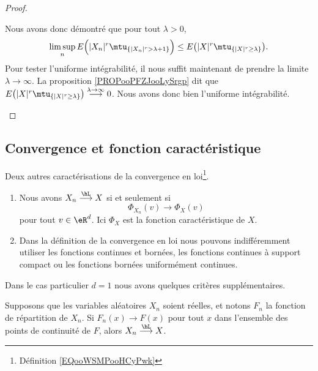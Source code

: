 \begin{proof}
\begin{subproof}
		Nous avons donc démontré que pour tout \( \lambda>0\),
		\begin{equation}
			\limsup_n E\Big( | X_n |^r\mtu_{\{ | X_n |^r>\lambda+1 \}} \Big) \leq E\big( | X |^r\mtu_{\{ | X |^r\geq \lambda \}} \big).
		\end{equation}
		Pour tester l'uniforme intégrabilité, il nous suffit maintenant de prendre la limite \( \lambda\to \infty\). La proposition \ref{PROPooPFZJooLySrgp} dit que \( E\big( | X |^r\mtu_{\{ | X |^r\geq \lambda \}} \big) \stackrel{ \lambda\to\infty}{\longrightarrow} 0\). Nous avons donc bien l'uniforme intégrabilité.
	\end{subproof}
\end{proof}

\subsection{Convergence et fonction caractéristique}


\begin{proposition}     \label{PrpopCaractCvL}
	Deux autres caractérisations de la convergence en loi\footnote{Définition \ref{EQooWSMPooHCyPwk}}.
	\begin{enumerate}
		\item
		      Nous avons \( X_n\stackrel{\hL}{\longrightarrow}X\) si et seulement si
		      \begin{equation}
			      \Phi_{X_n}(v)\to\Phi_X(v)
		      \end{equation}
		      pour tout \( v\in\eR^d\). Ici \( \Phi_X\) est la fonction caractéristique de \( X\).
		\item
		      Dans la définition de la convergence en loi nous pouvons indifféremment utiliser les fonctions continues et bornées, les fonctions continues à support compact ou les fonctions bornées uniformément continues.
	\end{enumerate}
\end{proposition}


Dans le cas particulier \( d=1\) nous avons quelques critères supplémentaires.

\begin{proposition}     \label{PropoFnrepCvL}
	Supposons que les variables aléatoires \( X_n\) soient réelles, et notons \( F_n\) la fonction de répartition de \( X_n\). Si \( F_n(x)\to F(x)\) pour tout \( x\) dans l'ensemble des points de continuité de \( F\), alors \( X_n\stackrel{\hL}{\longrightarrow}X\).
\end{proposition}

